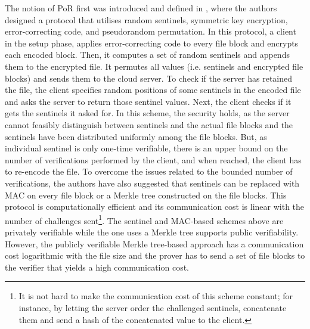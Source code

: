 The notion of PoR first was introduced and defined in \cite{DBLP:conf/ccs/JuelsK07}, where the authors designed a protocol that utilises  random sentinels, symmetric key encryption,  error-correcting code, and pseudorandom permutation. In this protocol, a client in the setup phase, applies error-correcting code to every file block and encrypts each encoded block. Then, it computes a set of random sentinels and appends them to the encrypted file. It  permutes all values (i.e. sentinels and encrypted file blocks) and sends them to the cloud  server.  To check if  the server has retained the file, the client specifies  random positions of some sentinels in the encoded file and asks
the server to return those sentinel values. Next, the client checks if it gets the sentinels it asked for. In this scheme, the security holds, as the server cannot feasibly distinguish between sentinels and the actual file blocks and the sentinels have been distributed uniformly among the file blocks. But, as individual sentinel is only one-time verifiable, there is an upper bound on the number of verifications performed by the client, and when reached, the client has to re-encode the file.  To overcome the issues related to the bounded number of verifications, the authors have also suggested that sentinels can be replaced with  MAC on every file block or a Merkle tree constructed on the file blocks. This protocol is computationally efficient and its communication cost is linear with the number of challenges sent\footnote{It is not hard to make the communication cost of this scheme constant; for instance, by letting the server order the challenged sentinels, concatenate them and send a hash of the concatenated value to the client.}. The sentinel and MAC-based schemes above are privately verifiable while the one uses a Merkle tree supports public verifiability. However, the publicly verifiable Merkle tree-based approach has a communication cost logarithmic with the file size and the prover has to send a set of file blocks to the verifier that yields a high communication cost. 


